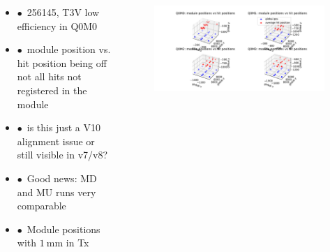 \documentclass[aspectratio=1610, 12pt]{beamer}
\begin{document}
\begin{frame}
  \begin{columns}
    \begin{column}[c]{0.35\textwidth}
      \begin{itemize}
        \item $\bullet$\, 256145, T3V low efficiency in Q0M0
        \item $\bullet$\, module position vs. hit position being off \to not all hits not registered in the module
        \item $\bullet$\, is this just a V10 alignment issue or still visible in v7/v8?
        \item $\bullet$\, Good news: MD and MU runs very comparable
        \item $\bullet$\, Module positions with $\SI{1}{\milli\m}$ in Tx
      \end{itemize}
    \end{column}
    \begin{column}[c]{0.65\textwidth}
      \begin{figure}
        \includegraphics[width=\textwidth]{plots/bad_module_Q0M0.pdf}
      \end{figure}
    \end{column}
  \end{columns}
\end{frame}
\end{document}
